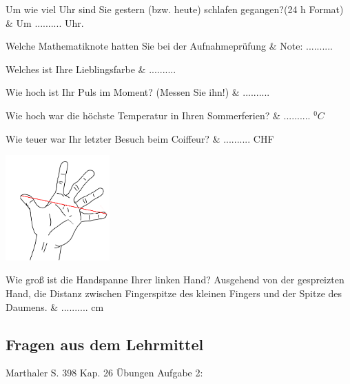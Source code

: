 \begin{befrage}
  Um wie viel Uhr sind Sie gestern (bzw. heute) schlafen gegangen?(24 h Format)  &
  Um .......... Uhr.
\end{befrage}


\begin{befrage}
  Welche Mathematiknote hatten Sie bei der Aufnahmeprüfung & Note: ..........
\end{befrage}

\begin{befrage}
 Welches ist Ihre Lieblingsfarbe  & ..........
\end{befrage}

\begin{befrage}
 Wie hoch ist Ihr Puls im Moment?
(Messen Sie ihn!)  & .......... %
\end{befrage}

\begin{befrage}
 Wie hoch war die höchste Temperatur in Ihren Sommerferien?  & .......... ${}^0C$
\end{befrage}

\begin{befrage}
 Wie teuer war Ihr letzter Besuch beim Coiffeur?  & .......... CHF
\end{befrage}

\begin{center}
\includegraphics[width=4cm]{img/hand.png}
\end{center}

\begin{befrage}
Wie groß ist die Handspanne Ihrer linken Hand?
Ausgehend von der gespreizten Hand, die Distanz zwischen Fingerspitze des kleinen Fingers und der Spitze des Daumens.  &  .......... cm
\end{befrage}

\subsection*{Fragen aus dem Lehrmittel}
Marthaler S. 398 Kap. 26 Übungen Aufgabe 2:

